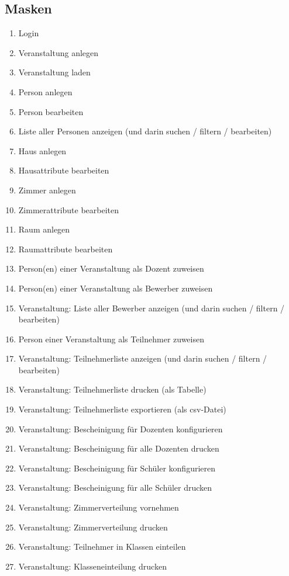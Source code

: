 \documentclass[a4paper]{scrartcl}
\begin{document}
	\subsection{Masken}
	\begin{enumerate}
		\item Login
		\item Veranstaltung anlegen
		\item Veranstaltung laden
		\item Person anlegen
		\item Person bearbeiten
		\item Liste aller Personen anzeigen (und darin suchen / filtern / bearbeiten)
		\item Haus anlegen
		\item Hausattribute bearbeiten
		\item Zimmer anlegen
		\item Zimmerattribute bearbeiten
		\item Raum anlegen
		\item Raumattribute bearbeiten
		\item Person(en) einer Veranstaltung als Dozent zuweisen
		\item Person(en) einer Veranstaltung als Bewerber zuweisen
		\item Veranstaltung: Liste aller Bewerber anzeigen (und darin suchen / filtern / bearbeiten)
		\item Person einer Veranstaltung als Teilnehmer zuweisen
		\item Veranstaltung: Teilnehmerliste anzeigen (und darin suchen / filtern / bearbeiten)
		\item Veranstaltung: Teilnehmerliste drucken (als Tabelle)
		\item Veranstaltung: Teilnehmerliste exportieren (als csv-Datei)
		\item Veranstaltung: Bescheinigung für Dozenten konfigurieren
		\item Veranstaltung: Bescheinigung für alle Dozenten drucken
		\item Veranstaltung: Bescheinigung für Schüler konfigurieren
		\item Veranstaltung: Bescheinigung für alle Schüler drucken
		\item Veranstaltung: Zimmerverteilung vornehmen
		\item Veranstaltung: Zimmerverteilung drucken
		\item Veranstaltung: Teilnehmer in Klassen einteilen
		\item Veranstaltung: Klasseneinteilung drucken

\end{enumerate}
\end{document}
